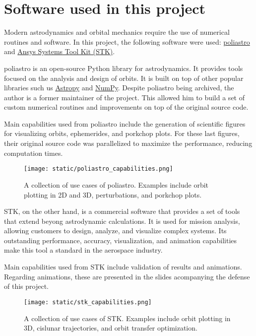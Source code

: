 \section{Software used in this project}

Modern astrodynamics and orbital mechanics require the use of numerical routines
and software. In this project, the following software were used:
\href{https://github.com/poliastro/poliastro}{poliastro} and
\href{https://www.ansys.com/products/missions/ansys-stk}{Ansys Systems Tool Kit
  (STK)}.

poliastro is an open-source Python library for astrodynamics. It provides tools
focused on the analysis and design of orbits. It is built on top of other
popular libraries such us \href{https://github.com/astropy/astropy}{Astropy} and
\href{https://github.com/numpy/numpy}{NumPy}. Despite poliastro being archived,
the author is a former maintainer of the project. This allowed him to build a
set of custom numerical routines and improvements on top of the original source
code.

Main capabilities used from poliastro include the generation of scientific
figures for visualizing orbits, ephemerides, and porkchop plots. For these last
figures, their original source code was parallelized to maximize the
performance, reducing computation times.

\vspace{1cm}
\begin{figure}[H] \centering
  \texttt{[image: static/poliastro\_capabilities.png]}
  \caption[A collection of use cases of poliastro.]{A collection of use
    cases of poliastro. Examples include orbit plotting in 2D and 3D,
    perturbations, and porkchop plots.}
  \label{fig:poliastro_capabilities}
\end{figure}

STK, on the other hand, is a commercial software that provides a set of tools
that extend beyong astrodynamic calculations. It is used for mission analysis,
allowing customers to design, analyze, and visualize complex systems. Its
outstanding performance, accuracy, visualization, and animation capabilities
make this tool a standard in the aerospace industry.

Main capabilities used from STK include validation of results and animations.
Regarding animations, these are presented in the slides acompanying the defense
of this project.

\vspace{1cm}
\begin{figure}[H] \centering
  \texttt{[image: static/stk\_capabilities.png]}
  \caption[A collection of use cases of STK.]{A collection of use
    cases of STK. Examples include orbit plotting in 3D, cislunar
    trajectories, and orbit transfer optimization.}
  \label{fig:stk_capabilities}
\end{figure}



